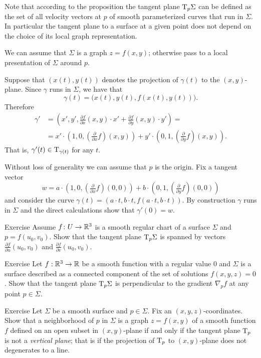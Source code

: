 Note that according to the proposition the tangent plane $\mathrm{T}_p\Sigma$ can be defined as the set of all velocity vectors at $p$ of smooth parameterized curves that run in $\Sigma$. 
In particular the tangent plane to a surface at a given point does not depend on the choice of its local graph representation.

We can assume that $\Sigma$ is a graph $z=f(x,y)$; 
otherwise pass to a local presentation of $\Sigma$ around $p$.

Suppose that $(x(t),y(t))$ denotes the projection of $\gamma(t)$ to the $(x,y)$-plane.
Since $\gamma$ runs in $\Sigma$, we have that
\[\gamma(t)=\bigl(x(t),y(t),f(x(t),y(t))\bigr).\]
Therefore 
\begin{align*}
\gamma'&=(x',y',\tfrac{\partial f}{\partial x}(x,y)\cdot x'+\tfrac{\partial f}{\partial y}(x,y)\cdot y')=
\\
&=x'\cdot (1,0,(\tfrac{\partial}{\partial x}f)(x,y))+y'\cdot (0,1,(\tfrac{\partial}{\partial y}f)(x,y)).
\end{align*}
That is, $\gamma'(t)\in\mathrm{T}_{\gamma(t)}$ for any $t$.

Without loss of generality we can assume that $p$ is the origin.
Fix a tangent vector 
\[w=a\cdot (1,0,(\tfrac{\partial}{\partial x}f)(0,0))+b\cdot(0,1,(\tfrac{\partial}{\partial y}f)(0,0))\] 
and consider the curve $\gamma(t)=(a\cdot t, b\cdot t, f(a\cdot t,b\cdot t))$.
By construction $\gamma$ runs in $\Sigma$ and the direct calculations show that $\gamma'(0)=w$.
\qeds

\begin{thm}{Exercise}\label{ex:tangent-chart}
Assume $f\colon U\to\mathbb{R}^3$ is a smooth regular chart of a surface $\Sigma$ and $p=f(u_0,v_0)$.
Show that the tangent plane $\mathrm{T}_p\Sigma$ is spanned by vectors $\tfrac{\partial f}{\partial u}(u_0,v_0)$ and $\tfrac{\partial f}{\partial v}(u_0,v_0)$.
\end{thm}

\begin{thm}{Exercise}\label{ex:tangent-normal}
Let $f:\mathbb{R}^3\to\mathbb{R}$ be a smooth function with a regular value $0$ and $\Sigma$ is a surface described as a connected component of the set of solutions $f(x,y,z)=0$.
Show that the tangent plane $\mathrm{T}_p\Sigma$ is perpendicular to the gradient $\nabla_pf$ at any point $p\in\Sigma$.
\end{thm}

\begin{thm}{Exercise}\label{ex:vertical-tangent}
Let $\Sigma$ be a smooth surface and $p\in\Sigma$.
Fix an $(x,y,z)$-coordinates.
Show that a neighborhood of $p$ in $\Sigma$ is a graph $z=f(x,y)$ of a smooth function $f$ defined on an open subset in $(x,y)$-plane if and only if the tangent plane $\mathrm{T}_p$ is not a \emph{vertical plane}; that is if the projection of $\mathrm{T}_p$ to $(x,y)$-plane does not degenerates to a line.
\end{thm}



